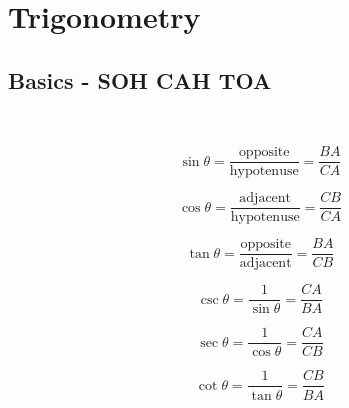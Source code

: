 \chapter{Trigonometry}

\section{Basics - SOH CAH TOA}

\\[18pt]

\begin{minipage}{0.5\textwidth}
  \begin{equation*}
    \sin \theta = \frac{\text{opposite}}{\text{hypotenuse}} = \frac{BA}{CA}
  \end{equation*}

  \begin{equation*}
    \cos \theta = \frac{\text{adjacent}}{\text{hypotenuse}} = \frac{CB}{CA}
  \end{equation*}

  \begin{equation*}
    \tan \theta = \frac{\text{opposite}}{\text{adjacent}} = \frac{BA}{CB}
  \end{equation*}
\vspace{0.5cm}
\end{minipage}
\begin{minipage}{0.5\textwidth}
  \begin{equation*}
    \csc \theta = \frac{1}{\sin \theta} = \frac{CA}{BA}
  \end{equation*}

  \begin{equation*}
    \sec \theta = \frac{1}{\cos \theta} = \frac{CA}{CB}
  \end{equation*}

  \begin{equation*}
    \cot \theta = \frac{1}{\tan \theta} = \frac{CB}{BA}
  \end{equation*}
\end{minipage}


